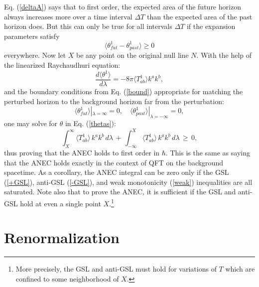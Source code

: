 \documentclass{article}
\begin{document}
Eq. (\ref{deltaA}) says that to first order, the expected area of the future horizon always increases more over a time interval $\Delta T$ than the expected area of the past horizon does.  But this can only be true for all intervals $\Delta T$ if the expansion parameters satisfy
\begin{equation}\label{thetas} 
\langle \theta^{1}_{fut} - \theta^{1}_{past} \rangle \ge 0
\end{equation}
everywhere.  Now let $X$ be any point on the original null line $N$.  With the help of the linearized Raychaudhuri equation:
\begin{equation}\label{linray}
\frac{d \langle \theta^{1} \rangle }{d\lambda} = -8\pi \langle T_{ab}^{1} \rangle k^a k^b,
\end{equation}
and the boundary conditions from Eq. (\ref{bound}) appropriate for matching the perturbed horizon to the background horizon far from the perturbation:
\begin{equation}
\langle \theta^{1}_{fut} \rangle |_{\lambda = \infty} = 0,\quad \langle \theta^{1}_{past} \rangle |_{\lambda = -\infty} = 0,
\end{equation}
one may solve for $\theta$ in Eq. (\ref{thetas}):
\begin{equation}\label{ANEC2}
\int_X^\infty \langle T_{ab}^{1} \rangle \, k^a k^b\,d\lambda 
\,+\, \int_{-\infty}^X \langle T_{ab}^{1} \rangle \,k^a k^b\,d\lambda \,\ge\, 0,
\end{equation}
thus proving that the ANEC holds to first order in $\hbar$.  This is the same as saying that the ANEC holds exactly in the context of QFT on the background spacetime.  As a corollary, the ANEC integral can be zero only if the GSL (\ref{+GSL}), anti-GSL (\ref{-GSL}), and weak monotonicity (\ref{weak}) inequalities are all saturated.  Note also that to prove the ANEC, it is sufficient if the GSL and anti-GSL hold at even a single point $X$.\footnote{More precisely, the GSL and anti-GSL must hold for variations of $T$ which are confined to some neighborhood of $X$.}

\section{Renormalization}\label{ren}
\end{document}
